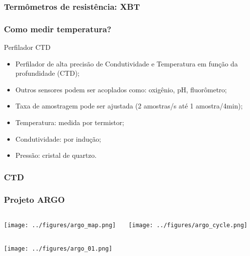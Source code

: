 \begin{frame}
\frametitle{Termômetros de resistência: XBT}
    \begin{center}
    \end{center}
\end{frame}

\begin{frame}
\frametitle{Como medir temperatura?}
    Perfilador CTD
    \small{
    \begin{itemize}[<+-| alert@+>]
    \item Perfilador de alta precisão de Condutividade e Temperatura em
          função da profundidade (CTD);
    \item Outros sensores podem ser acoplados como: oxigênio, pH, fluorômetro;
    \item Taxa de amostragem pode ser ajustada (2 amostras/s até 1 amostra/4min);
    \item Temperatura: medida por termistor;
    \item Condutividade: por indução;
    \item Pressão: cristal de quartzo.
    \end{itemize}
    }
\end{frame}

\begin{frame}
\frametitle{CTD}
    \begin{center}
    \end{center}
\end{frame}

\begin{frame}
\frametitle{Projeto ARGO}
    \begin{columns}
        \begin{column}{0.5\textwidth}
    \begin{center}
        \texttt{[image: ../figures/argo\_map.png]}
    \end{center}
        \end{column}
    \begin{column}{0.5\textwidth}
    \begin{center}
       \texttt{[image: ../figures/argo\_cycle.png]}
    \end{center}
    \end{column}
    \end{columns}
        \begin{center}
        \texttt{[image: ../figures/argo\_01.png]}    \end{center}
\end{frame}

